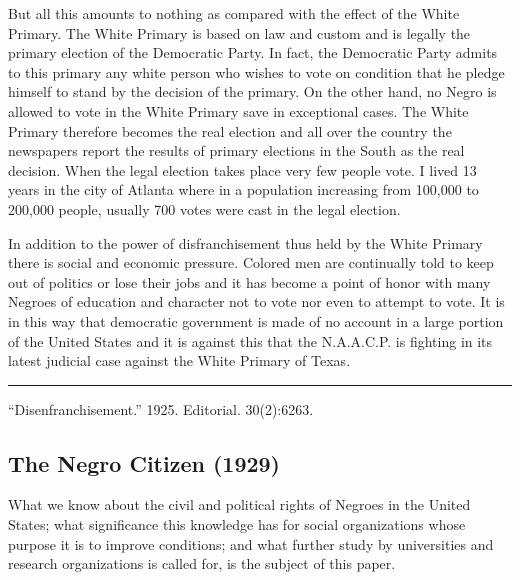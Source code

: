 \documentclass[letterpaper,10pt,english]{jupyterBook}
\begin{document}
\sphinxAtStartPar
But all this amounts to nothing as compared with the effect of the White Primary. The White Primary is based on law and custom and is legally the primary election of the Democratic Party. In fact, the Democratic Party admits to this primary any white person who wishes to vote on condition that he pledge himself to stand by the decision of the primary. On the other hand, no Negro is allowed to vote in the White Primary save in exceptional cases. The White Primary therefore becomes the real election and all over the country the newspapers report the results of primary elections in the South as the real decision. When the legal election takes place very few people vote. I lived 13 years in the city of Atlanta where in a population increasing from 100,000 to 200,000 people, usually 700 votes were cast in the legal election.

\sphinxAtStartPar
In addition to the power of disfranchisement thus held by the White Primary there is social and economic pressure. Colored men are continually told to keep out of politics or lose their jobs and it has become a point of honor with many Negroes of education and character not to vote nor even to attempt to vote. It is in this way that democratic government is made of no account in a large portion of the United States and it is against this that the N.A.A.C.P. is fighting in its latest judicial case against the White Primary of Texas.


\bigskip\hrule\bigskip


\sphinxAtStartPar
{} “Disenfranchisement.” 1925. Editorial.  30(2):62\sphinxhyphen{}63.


\subsection{The Negro Citizen (1929)}
\label{\detokenize{Volumes/36/05/negro_citizen:the-negro-citizen-1929}}\label{\detokenize{Volumes/36/05/negro_citizen::doc}}
\sphinxAtStartPar
{}

\sphinxAtStartPar
What we know about the civil and political rights of Negroes in the United States; what significance this knowledge has for social organizations whose purpose it is to improve conditions; and what further study by universities and research organizations is called for, is the subject of this paper.
\end{document}
